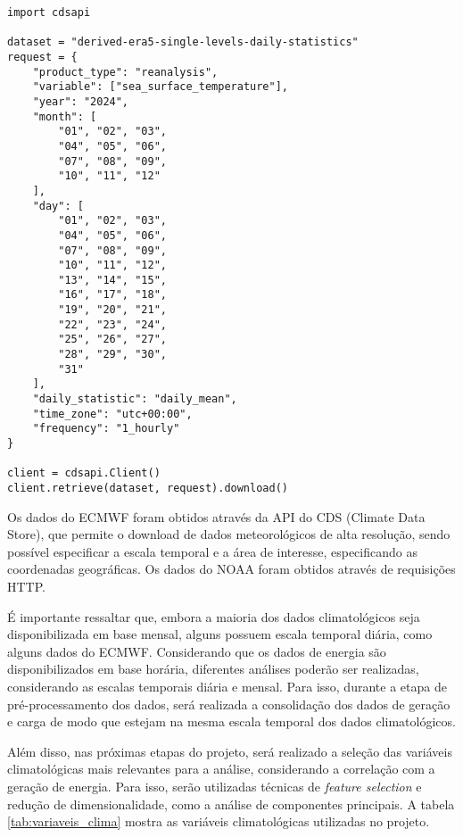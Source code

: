 \begin{verbatim}
import cdsapi

dataset = "derived-era5-single-levels-daily-statistics"
request = {
    "product_type": "reanalysis",
    "variable": ["sea_surface_temperature"],
    "year": "2024",
    "month": [
        "01", "02", "03",
        "04", "05", "06",
        "07", "08", "09",
        "10", "11", "12"
    ],
    "day": [
        "01", "02", "03",
        "04", "05", "06",
        "07", "08", "09",
        "10", "11", "12",
        "13", "14", "15",
        "16", "17", "18",
        "19", "20", "21",
        "22", "23", "24",
        "25", "26", "27",
        "28", "29", "30",
        "31"
    ],
    "daily_statistic": "daily_mean",
    "time_zone": "utc+00:00",
    "frequency": "1_hourly"
}

client = cdsapi.Client()
client.retrieve(dataset, request).download()

\end{verbatim}

Os dados do ECMWF foram obtidos através da API do CDS (Climate Data Store), que permite o download de dados 
meteorológicos de alta resolução, sendo possível especificar a escala temporal e a área de interesse, especificando as 
coordenadas geográficas. Os dados do NOAA foram obtidos através de requisições HTTP.

É importante ressaltar que, embora a maioria dos dados climatológicos seja disponibilizada em base mensal, alguns
possuem escala temporal diária, como alguns dados do ECMWF. Considerando que os dados de energia são disponibilizados em
base horária, diferentes análises poderão ser realizadas, considerando as escalas temporais diária e mensal. Para isso,
durante a etapa de pré-processamento dos dados, será realizada a consolidação dos dados de geração e carga de modo que
estejam na mesma escala temporal dos dados climatológicos.

\begin{figure}[!ht]
	{}
	{}
\end{figure}

Além disso, nas próximas etapas do projeto, será realizado a seleção das variáveis climatológicas mais relevantes para
a análise, considerando a correlação com a geração de energia. Para isso, serão utilizadas técnicas de \textit{feature
selection} e redução de dimensionalidade, como a análise de componentes principais. A tabela \ref{tab:variaveis_clima}
mostra as variáveis climatológicas utilizadas no projeto.


